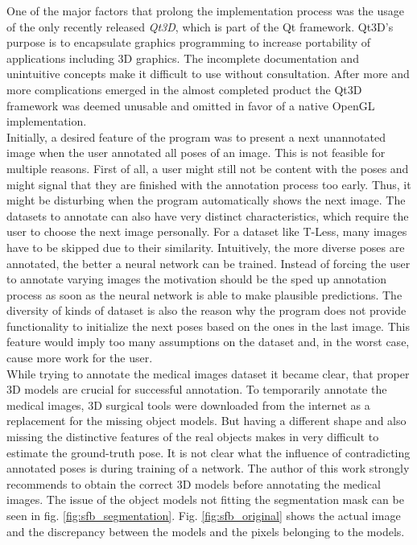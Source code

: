 One of the major factors that prolong the implementation process was the usage of the only recently released \textit{Qt3D}, which is part of the Qt framework. Qt3D's purpose is to encapsulate graphics programming to increase portability of applications including 3D graphics. The incomplete documentation and unintuitive concepts make it difficult to use without consultation. After more and more complications emerged in the almost completed product the Qt3D framework was deemed unusable and omitted in favor of a native OpenGL implementation. \\

Initially, a desired feature of the program was to present a next unannotated image when the user annotated all poses of an image. This is not feasible for multiple reasons. First of all, a user might still not be content with the poses and might signal that they are finished with the annotation process too early. Thus, it might be disturbing when the program automatically shows the next image. The datasets to annotate can also have very distinct characteristics, which require the user to choose the next image personally. For a dataset like T-Less, many images have to be skipped due to their similarity. Intuitively, the more diverse poses are annotated, the better a neural network can be trained. Instead of forcing the user to annotate varying images the motivation should be the sped up annotation process as soon as the neural network is able to make plausible predictions. The diversity of kinds of dataset is also the reason why the program does not provide functionality to initialize the next poses based on the ones in the last image. This feature would imply too many assumptions on the dataset and, in the worst case, cause more work for the user. \\

While trying to annotate the medical images dataset it became clear, that proper 3D models are crucial for successful annotation. To temporarily annotate the medical images, 3D surgical tools were downloaded from the internet as a replacement for the missing object models. But having a different shape and also missing the distinctive features of the real objects makes in very difficult to estimate the ground-truth pose. It is not clear what the influence of contradicting annotated poses is during training of a network. The author of this work strongly recommends to obtain the correct 3D models before annotating the medical images. The issue of the object models not fitting the segmentation mask can be seen in fig. \ref{fig:sfb_segmentation}. Fig. \ref{fig:sfb_original} shows the actual image and the discrepancy between the models and the pixels belonging to the models. \\


